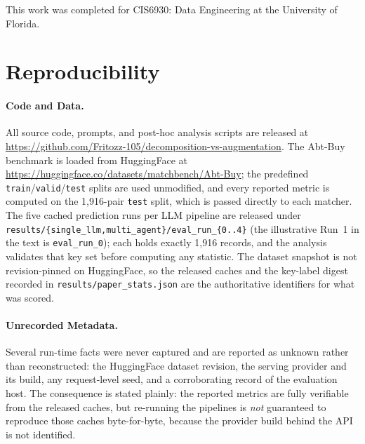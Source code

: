 \documentclass[sigconf]{acmart}
\begin{document}
\begin{acks}
This work was completed for CIS6930: Data Engineering at the University of Florida.
\end{acks}





\clearpage
\appendix

\section{Reproducibility}
\label{app:repro}

\paragraph{Code and Data.}
All source code, prompts, and post-hoc analysis scripts are released at \url{https://github.com/Fritozz-105/decomposition-vs-augmentation}. The Abt-Buy benchmark is loaded from HuggingFace at \url{https://huggingface.co/datasets/matchbench/Abt-Buy}; the predefined \texttt{train}/\texttt{valid}/\texttt{test} splits are used unmodified, and every reported metric is computed on the 1,916-pair \texttt{test} split, which is passed directly to each matcher. The five cached prediction runs per LLM pipeline are released under \texttt{results/\{single\_llm,multi\_agent\}/eval\_run\_\{0..4\}} (the illustrative Run~1 in the text is \texttt{eval\_run\_0}); each holds exactly 1,916 records, and the analysis validates that key set before computing any statistic. The dataset snapshot is not revision-pinned on HuggingFace, so the released caches and the key-label digest recorded in \texttt{results/paper\_stats.json} are the authoritative identifiers for what was scored.

\paragraph{Unrecorded Metadata.}
Several run-time facts were never captured and are reported as unknown rather than reconstructed: the HuggingFace dataset revision, the serving provider and its build, any request-level seed, and a corroborating record of the evaluation host. The consequence is stated plainly: the reported metrics are fully verifiable from the released caches, but re-running the pipelines is \emph{not} guaranteed to reproduce those caches byte-for-byte, because the provider build behind the API is not identified.
\end{document}
